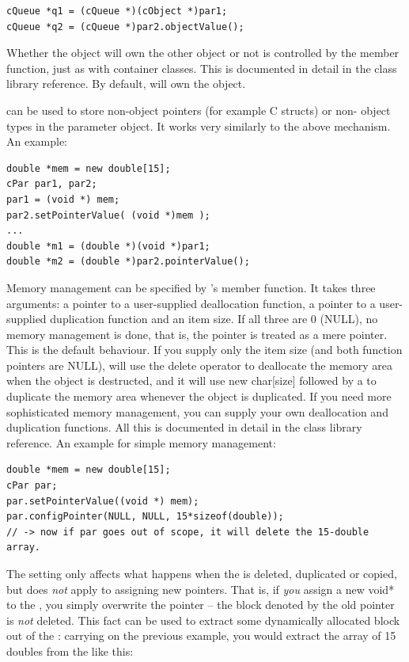 \begin{verbatim}
cQueue *q1 = (cQueue *)(cObject *)par1;
cQueue *q2 = (cQueue *)par2.objectValue();
\end{verbatim}


Whether the  object will own the other object or not is
controlled by the  member
function, just as with container classes. This is documented in detail
in the class library reference.  By default,  will own
the object.

 can be used to store non-object
pointers (for example C structs) or
non-{\opp} object types in the parameter object.  It works very
similarly to the above mechanism. An example:

\begin{verbatim}
double *mem = new double[15];
cPar par1, par2;
par1 = (void *) mem;
par2.setPointerValue( (void *)mem );
...
double *m1 = (double *)(void *)par1;
double *m2 = (double *)par2.pointerValue();
\end{verbatim}


Memory management can be specified by
's  member function. It takes
three arguments: a pointer to a user-supplied deallocation
function, a pointer to a user-supplied duplication function and
an item size. If all three are 0 (NULL), no memory management is done,
that is, the pointer is treated as a mere pointer. This is the default
behaviour. If you supply only the item size (and both function
pointers are NULL),  will use the delete operator to
deallocate the memory area when the  object is
destructed, and it will use new char[size] followed by a
 to duplicate the memory area whenever the
 object is duplicated. If you need more sophisticated
memory management, you can supply your own deallocation and
duplication functions.  All this is documented in detail in the class
library reference.  An example for simple memory management:

\begin{verbatim}
double *mem = new double[15];
cPar par;
par.setPointerValue((void *) mem);
par.configPointer(NULL, NULL, 15*sizeof(double));
// -> now if par goes out of scope, it will delete the 15-double array.
\end{verbatim}

The  setting only affects what happens when the
 is deleted, duplicated or copied, but does \textit{not}
apply to assigning new pointers. That is, if \textit{you} assign a new
void* to the , you simply overwrite the pointer -- the
block denoted by the old pointer is \textit{not} deleted. This fact
can be used to extract some dynamically allocated block out of the
: carrying on the previous example, you would extract the
array of 15 doubles from the  like this:

